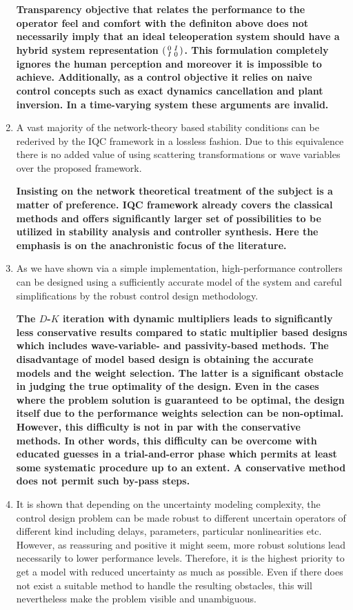 \begin{enumerate}
    {\bfseries Transparency objective that relates the performance to the operator feel and comfort with the definiton above does not 
    necessarily imply that an ideal teleoperation system should have a hybrid system representation $\begin{psmallmatrix}0&I\\I&0\end{psmallmatrix}$. 
    This formulation completely ignores the human perception and moreover it is impossible to achieve. Additionally, as a control objective 
    it relies on naive control concepts such as exact dynamics cancellation and plant inversion. In a time-varying system these arguments 
    are invalid.
    }
    \item A vast majority of the network-theory based stability conditions can be rederived by the IQC framework in a lossless fashion. 
    Due to this equivalence there is no added value of using scattering transformations or wave variables over the proposed framework. 
    
    {\bfseries Insisting on the network theoretical treatment of the subject is a matter of preference. IQC framework already covers the 
    classical methods and offers significantly larger set of possibilities to be utilized in stability analysis and controller synthesis. Here 
    the emphasis is on the anachronistic focus of the literature. 
    }
    \item As we have shown via a simple implementation, high-performance controllers can be designed using a sufficiently accurate model of
    the system and careful simplifications by the robust control design methodology. 
    
    {\bfseries The $D$-$K$ iteration with dynamic multipliers leads to significantly less conservative results compared to static multiplier 
    based designs which includes wave-variable- and passivity-based methods. The disadvantage of model based design is obtaining the accurate
    models and the weight selection. The latter is a significant obstacle in judging the true optimality of the design. Even in the cases 
    where the problem solution is guaranteed to be optimal, the design itself due to the performance weights selection can be non-optimal. 
    However, this difficulty is not in par with the conservative methods. In other words, this difficulty can be overcome with educated 
    guesses in a trial-and-error phase which permits at least some systematic procedure up to an extent. A conservative method does not 
    permit such by-pass steps.
    }
    \item It is shown that depending on the uncertainty modeling complexity, the control design problem can be made robust to different 
    uncertain operators of different kind including delays, parameters, particular nonlinearities etc. However, as reassuring and positive 
    it might seem, more robust solutions lead necessarily to lower performance levels. Therefore, it is the highest priority to get a 
    model with reduced uncertainty as much as possible. Even if there does not exist a suitable method to handle the resulting obstacles, 
    this will nevertheless make the problem visible and unambiguous. 
    

\end{enumerate}
